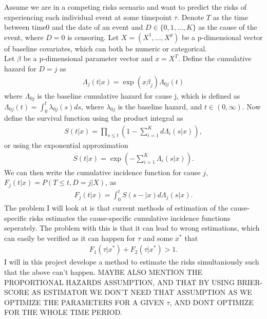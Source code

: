 \documentclass{article}
\begin{document}
Assume we are in a competing risks scenario and want to predict the risks of experiencing each individual event at some timepoint \(\tau\). Denote \(T\) as the time between time0 and the date of an event and \(D\in\{0,1,...,K\}\) as the cause of the event, where \(D = 0\) is censoring. Let \(X = (X^1,...,X^p)\) be a p-dimensional vector of baseline covariates, which can both be numeric or categorical.\\[0pt]
Let \(\beta\) be a p-dimensional parameter vector and \(x = X^T\). Define the cumulative hazard for \(D = j\) as
\begin{align*}
\Lambda_j(t|x) = \exp(x\beta_j)\Lambda_{0j}(t)
\end{align*}
where \(\Lambda_{0j}\) is the baseline cumulative hazard for cause j, which is defined as \(\Lambda_{0j}(t) = \int_0^t \lambda_{0j}(s)ds\), where \(\lambda_{0j}\) is the baseline hazard, and \(t\in(0,\infty)\). Now define the survival function using the product integral as
\begin{align*}
S(t|x) = \prod_{s \leq t}\left(1-\sum_{i = 1}^K d\Lambda_i(s|x)\right),
\end{align*}
or using the exponential approximation
\begin{align*}
S(t|x) = \exp\left(-\sum_{i = 1}^K \Lambda_i(s|x)\right).
\end{align*}
We can then write the cumulative incidence function for cause \(j\), \(F_j(t|x) = P(T\leq t, D = j|X)\), as
\begin{align*}
F_j(t|x) = \int_0^t S(s-|x)d\Lambda_j(s|x).
\end{align*}
The problem I will look at is that current methods of estimation of the cause-specific risks estimates the cause-specific cumulative incidence functions seperately. The problem with this is that it can lead to wrong estimations, which can easily be verified as it can happen for \(\tau\) and some \(x^*\) that
\begin{align}
F_1(\tau|x^*)+F_2(\tau|x^*)>1.
\end{align}
I will in this project develope a method to estimate the risks simultaniously such that the above can't happen. MAYBE ALSO MENTION THE PROPORTIONAL HAZARDS ASSUMPTION, AND THAT BY USING BRIER-SCORE AS ESTIMATOR WE DON'T NEED THAT ASSUMPTION AS WE OPTIMIZE THE PARAMETERS FOR A GIVEN \(\tau\), AND DONT OPTIMIZE FOR THE WHOLE TIME PERIOD.
\end{document}
